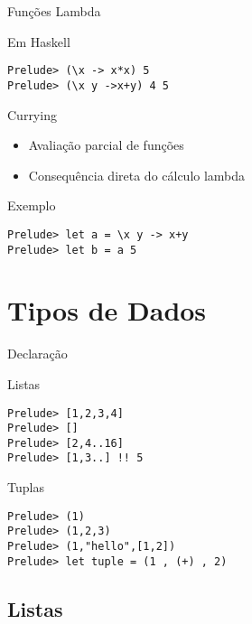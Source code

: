 \documentclass{beamer}
\begin{document}
	\begin{frame}[fragile]{Funções Lambda}
	 
	 \begin{block}{Em Haskell}
	  \begin{lstlisting}	
Prelude> (\x -> x*x) 5
Prelude> (\x y ->x+y) 4 5
	  \end{lstlisting}	  
	 \end{block}
	\end{frame}

	\begin{frame}[fragile]{Currying}
		\begin{itemize}
			\item Avaliação parcial de funções
			\item Consequência direta do cálculo lambda
		\end{itemize}
		\begin{block}{Exemplo}
		 \begin{lstlisting}
Prelude> let a = \x y -> x+y
Prelude> let b = a 5
		 \end{lstlisting}
		\end{block}
	\end{frame}	
	
	\section{Tipos de Dados}
	
	\begin{frame}{}
	\end{frame}
	
		\begin{frame}[fragile]{Declaração}
			\begin{block}{Listas}
		\begin{lstlisting}
Prelude> [1,2,3,4]
Prelude> []
Prelude> [2,4..16]
Prelude> [1,3..] !! 5
		 \end{lstlisting}
		\end{block}
		
		\begin{block}{Tuplas}
		\begin{lstlisting}
Prelude> (1)
Prelude> (1,2,3)
Prelude> (1,"hello",[1,2])
Prelude> let tuple = (1 , (+) , 2)
		 \end{lstlisting}
		\end{block}
		
		\end{frame}
	
	\subsection{Listas}
	
\end{document}
